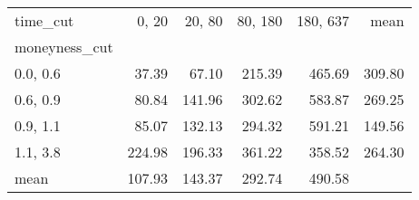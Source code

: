 \begin{tabular}{lrrrrr}
\toprule
time\_cut &  0, 20 &  20, 80 &  80, 180 &  180, 637 &   mean \\
moneyness\_cut &          &           &            &             &        \\
\midrule
0.0, 0.6    &    37.39 &     67.10 &     215.39 &      465.69 & 309.80 \\
0.6, 0.9    &    80.84 &    141.96 &     302.62 &      583.87 & 269.25 \\
0.9, 1.1    &    85.07 &    132.13 &     294.32 &      591.21 & 149.56 \\
1.1, 3.8    &   224.98 &    196.33 &     361.22 &      358.52 & 264.30 \\
mean          &   107.93 &    143.37 &     292.74 &      490.58 &        \\
\bottomrule
\end{tabular}

